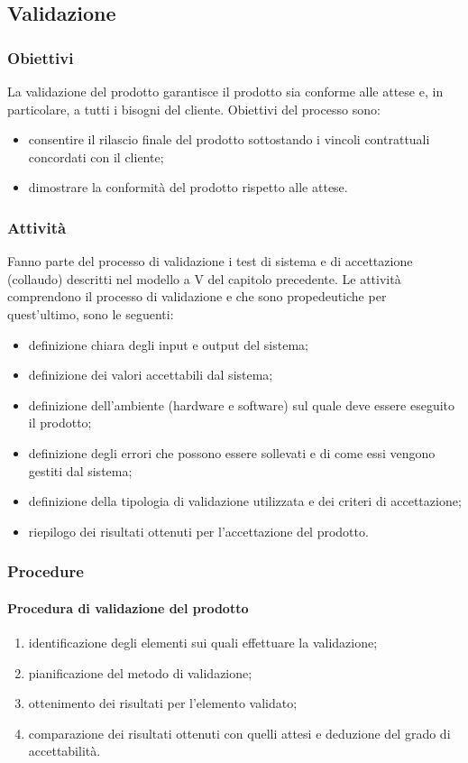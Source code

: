 \subsection{Validazione}
\subsubsection{Obiettivi}
La validazione del prodotto garantisce il prodotto sia conforme alle attese e, in particolare, a tutti i bisogni del cliente. Obiettivi del processo sono:
\begin{itemize}
	\item consentire il rilascio finale del prodotto sottostando i vincoli contrattuali concordati con il cliente;
	\item dimostrare la conformità del prodotto rispetto alle attese.
\end{itemize}

\subsubsection{Attività}
Fanno parte del processo di validazione i test di sistema e di accettazione (collaudo) descritti nel modello a V del capitolo precedente. Le attività comprendono il processo di validazione e che sono propedeutiche per quest'ultimo, sono le seguenti:
\begin{itemize}
	\item definizione chiara degli input e output del sistema;
	\item definizione dei valori accettabili dal sistema;
	\item definizione dell'ambiente (hardware e software) sul quale deve essere eseguito il prodotto;
	\item definizione degli errori che possono essere sollevati e di come essi vengono gestiti dal sistema;
	\item definizione della tipologia di validazione utilizzata e dei criteri di accettazione;
	\item riepilogo dei risultati ottenuti per l'accettazione del prodotto.
\end{itemize}

\subsubsection{Procedure}
\paragraph{Procedura di validazione del prodotto}
\begin{enumerate}
	\item identificazione degli elementi sui quali effettuare la validazione;
	\item pianificazione del metodo di validazione;
	\item ottenimento dei risultati per l'elemento validato;
	\item comparazione dei risultati ottenuti con quelli attesi e deduzione del grado di accettabilità.
\end{enumerate}